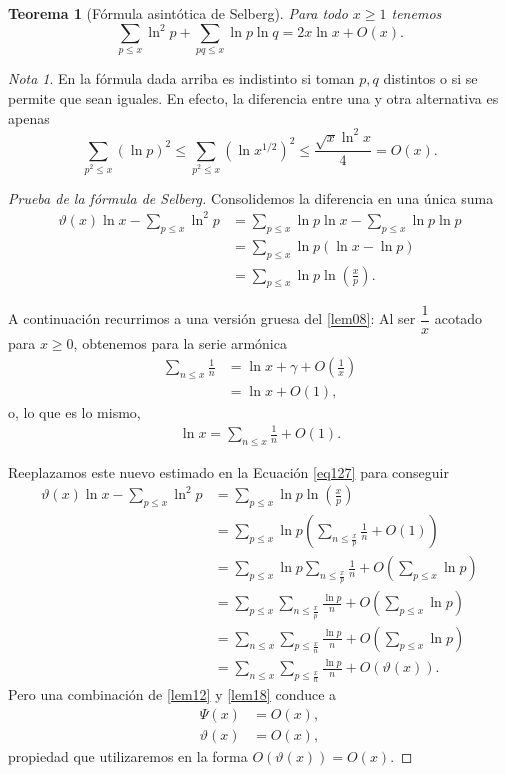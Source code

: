 \documentclass[10pt]{article}
\newtheorem{theorem}{Teorema}
\theoremstyle{definition}
\theoremstyle{remark}
\newtheorem*{note}{Nota}
\begin{document}
\begin{theorem}[F\'ormula asint\'otica de Selberg]\label{the22}
Para todo $x \geq 1$ tenemos
\[
\sum_{p \leq x} \ln^2 p + \sum_{pq \leq x} \ln p \ln q = 2x\ln x + O(x).
\]
\end{theorem}

\begin{note}
En la f\'ormula dada arriba es indistinto si toman $p,q$ distintos o si se permite que sean iguales. 
En efecto, la diferencia entre una y otra alternativa es apenas  
\[
\sum_{p^2 \le x} (\ln p)^2 \le \sum_{p^2 \le x} (\ln x^{1/2})^2 \le \frac{\sqrt{x} \ln^2 x}{4}= O(x).  
\]
\end{note}

\begin{proof}[Prueba de la f\'ormula de Selberg]
Consolidemos la diferencia en una \'unica suma 
\begin{align}
\vartheta(x)\ln x - \sum_{p \leq x} \ln^2 p &= \sum_{p \leq x} \ln p \ln x - \sum_{p \leq x} \ln p \ln p \\
&= \sum_{p \leq x} \ln p (\ln x - \ln p) \\
&= \sum_{p \leq x} \ln p \ln \left(\frac{x}{p}\right).\label{eq127}
\end{align}

A continuaci\'on recurrimos a una versi\'on gruesa del \cref{lem08}:
Al ser $\dfrac{1}{x}$ acotado para $x \ge 0$, obtenemos  para la serie arm\'onica 
\begin{align}
\sum_{n \leq x} \frac{1}{n} &= \ln x + \gamma + O\left(\frac{1}{x}\right) \\
&= \ln x + O(1),  
\end{align}
o, lo que es lo mismo, 
\begin{align}
\ln x = \sum_{n \leq x} \frac{1}{n} + O(1). 
\end{align}

Reeplazamos este nuevo estimado en la Ecuaci\'on \ref{eq127} para conseguir 
\begin{align}
\vartheta(x)\ln x - \sum_{p \leq x} \ln^2 p &= \sum_{p \leq x} \ln p \ln \left(\frac{x}{p}\right) \\
&= \sum_{p \leq x} \ln p \left(\sum_{n \leq \frac{x}{p}} \frac{1}{n} + O(1)\right) \\
&= \sum_{p \leq x} \ln p \sum_{n \leq \frac{x}{p}} \frac{1}{n} + O\left(\sum_{p \leq x} \ln p\right) \\
&= \sum_{p \leq x} \sum_{n \leq \frac{x}{p}} \frac{\ln p}{n} + O\left(\sum_{p \leq x} \ln p\right) \\
&= \sum_{n \leq x} \sum_{p \leq \frac{x}{n}} \frac{\ln p}{n} + O\left(\sum_{p \leq x} \ln p\right) \\
&= \sum_{n \leq x} \sum_{p \leq \frac{x}{n}} \frac{\ln p}{n} + O(\vartheta(x)).\label{eq136}
\end{align}
Pero una combinaci\'on de \cref{lem12} y \cref{lem18} conduce a 
\begin{align}
\Psi(x) &= O(x),  \\
\vartheta(x) &= O(x),
\end{align}
propiedad que utilizaremos en la forma $O(\vartheta(x))=O(x)$.


\end{proof}
\end{document}
